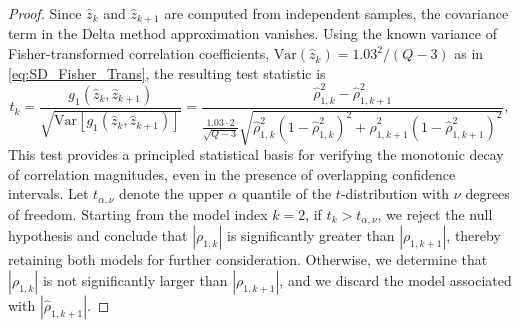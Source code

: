\begin{proof}
%
Since $\widehat z_k$ and $\widehat z_{k+1}$ are computed from independent samples, the covariance term in the Delta method approximation vanishes. Using the known variance of Fisher-transformed correlation coefficients, $\text{Var}(\widehat z_k) = 1.03^2 / (Q - 3)$ as in \eqref{eq:SD_Fisher_Trans}, the resulting test statistic is
%
\begin{equation}\label{eq:Conidtion_1_t_test}
    t_k = \frac{g_1(\widehat z_k,\widehat z_{k+1})}{\sqrt{\text{Var}[g_1(\widehat z_k,\widehat z_{k+1})]}}=\frac{\widehat \rho_{1,k}^2-\widehat \rho_{1,k+1}^2}{\frac{1.03\cdot 2}{\sqrt{Q-3}}\sqrt{\widehat \rho_{1,k}^2\left(1-\widehat \rho_{1,k}^2\right)^2 +\widehat \rho_{1,k+1}^2\left(1-\widehat \rho_{1,k+1}^2\right)^2}}, 
\end{equation}
%
This test provides a principled statistical basis for verifying the monotonic decay of correlation magnitudes, even in the presence of overlapping confidence intervals. 
Let $t_{\alpha,\nu}$ denote the upper $\alpha$ quantile of the $t$-distribution with $\nu$ degrees of freedom. Starting from the model index $k=2$, if $t_k > t_{\alpha,\nu}$, we reject the null hypothesis and conclude that $|\rho_{1,k}|$ is significantly greater than $|\rho_{1,k+1}|$, thereby retaining both models for further consideration. Otherwise, we determine that $|\rho_{1,k}|$ is not significantly larger than $|\rho_{1,k+1}|$, and we discard the model associated with $|\widehat \rho_{1,k+1}|$.



\end{proof}
